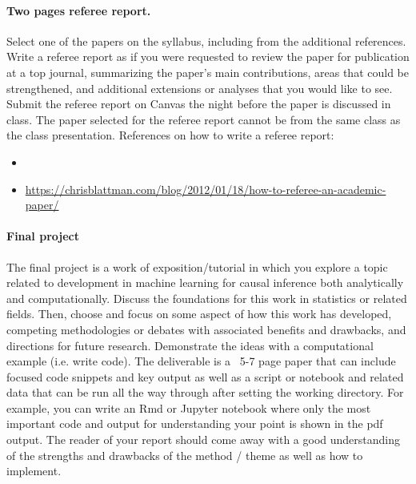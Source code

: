 \documentclass[letterpaper, 12pt, parskip=full,DIV=10]{scrartcl}
\begin{document}
\paragraph{Two pages referee report.}
Select one of the papers on the syllabus, including from the additional references. Write a referee report as if you were requested to review the paper for publication at a top journal, summarizing the paper's main contributions, areas that could be strengthened, and additional extensions or analyses that you would like to see. Submit the referee report on Canvas the night before the paper is discussed in class. The paper selected for the referee report cannot be from the same class as the class presentation. 
References on how to write a referee report:
\begin{itemize}
\item {}
 \item \url{https://chrisblattman.com/blog/2012/01/18/how-to-referee-an-academic-paper/}
 \end{itemize}

\paragraph{Final project}
The final project is a work of exposition/tutorial in which you explore a topic related to development in machine learning for causal inference both analytically and computationally.  Discuss the foundations for this work in statistics or related fields. Then, choose and focus on some aspect of how this work has developed, competing methodologies or debates with associated benefits and drawbacks, and directions for future research. Demonstrate the ideas with a computational example (i.e. write code). The deliverable is a ~5-7 page paper that can include focused code snippets and key output as well as a script or notebook and related data that can be run all the way through after setting the working directory. For example, you can write an Rmd or Jupyter notebook where only the most important code and output for understanding your point is shown in the pdf output.  The reader of your report should come away with a good understanding of the strengths and drawbacks of the method / theme as well as how to implement.
\end{document}
